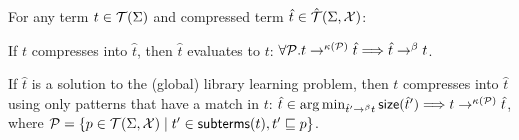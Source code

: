 \begin{theorem}
  For any term $t \in \mathcal{T}(\Sigma)$ and compressed term $\hat{t} \in \hat{\mathcal{T}}(\Sigma,\mathcal{X})$:
  \begin{description}[font=\itshape]
    \item[(Soundness)] If $t$ compresses into $\hat{t}$, then $\hat{t}$ evaluates to $t$: $\forall \mathcal{P} . t \rightarrow^{\kappa(\mathcal{P})} \hat{t} \Longrightarrow \hat{t} \rightarrow^{\beta} t$.
    \item[(Completeness)] If $\hat{t}$ is a solution to the (global) library learning problem, 
    then $t$ compresses into $\hat{t}$ using only patterns that have a match in $t$:
    $\hat{t} \in \operatorname*{arg\,min}_{\hat{t}' \rightarrow^{\beta} t} \mathsf{size}(\hat{t}') \Longrightarrow t \rightarrow^{\kappa(\mathcal{P})} \hat{t}$, 
    where $\mathcal{P} = \{p \in \mathcal{T}(\Sigma,\mathcal{X}) \mid t' \in \mathsf{subterms}(t) , t' \sqsubseteq p\}$.
  \end{description}
\label{thm:pat-lib-learning-app}
\end{theorem} 

